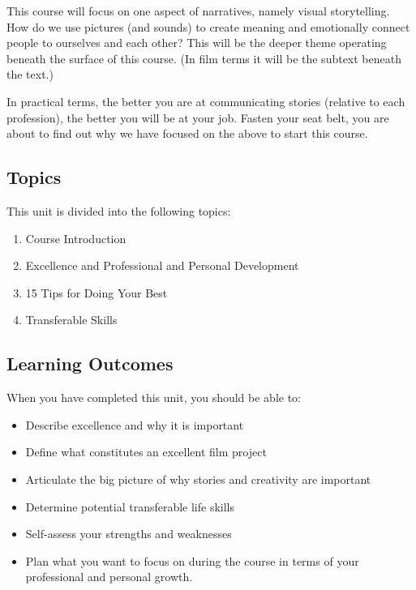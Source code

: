 \documentclass[
]{book}
\providecommand{\tightlist}{%
  \setlength{\itemsep}{0pt}\setlength{\parskip}{0pt}}
\begin{document}
This course will focus on one aspect of narratives, namely visual storytelling. How do we use pictures (and sounds) to create meaning and emotionally connect people to ourselves and each other? This will be the deeper theme operating beneath the surface of this course. (In film terms it will be the subtext beneath the text.)

In practical terms, the better you are at communicating stories (relative to each profession), the better you will be at your job. Fasten your seat belt, you are about to find out why we have focused on the above to start this course.

\hypertarget{topics}{%
\subsection*{Topics}\label{topics}}

This unit is divided into the following topics:

\begin{enumerate}
\def\labelenumi{\arabic{enumi}.}
\tightlist
\item
  Course Introduction\\
\item
  Excellence and Professional and Personal Development\\
\item
  15 Tips for Doing Your Best\\
\item
  Transferable Skills
\end{enumerate}

\hypertarget{learning-outcomes}{%
\subsection*{Learning Outcomes}\label{learning-outcomes}}

When you have completed this unit, you should be able to:

\begin{itemize}
\tightlist
\item
  Describe excellence and why it is important\\
\item
  Define what constitutes an excellent film project\\
\item
  Articulate the big picture of why stories and creativity are important\\
\item
  Determine potential transferable life skills\\
\item
  Self-assess your strengths and weaknesses\\
\item
  Plan what you want to focus on during the course in terms of your professional and personal growth.
\end{itemize}
\end{document}
